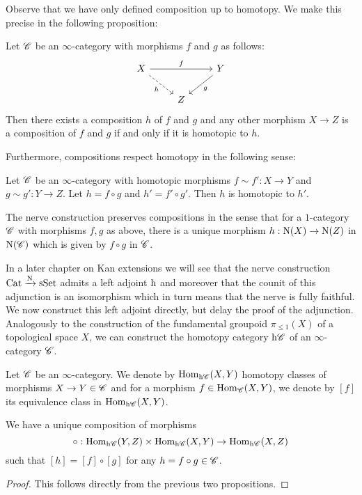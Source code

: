 \documentclass[../../thesis.tex]{subfiles}
\begin{document}
Observe that we have only defined composition up to homotopy.
We make this precise in the following proposition:
\begin{proposition}
    Let $\mathscr{C}$ be an $\infty$-category with morphisms $f$ and $g$ as follows:
    \[\begin{tikzcd}
            X && Y \\
            & Z
            \arrow["f", from=1-1, to=1-3]
            \arrow["g", from=1-3, to=2-2]
            \arrow["h"', dashed, from=1-1, to=2-2]
        \end{tikzcd}\]
    Then there exists a composition $h$ of $f$ and $g$ and any other morphism $X\to Z$ is a composition of $f$ and $g$ if and only if it is homotopic to $h$.
\end{proposition}
Furthermore, compositions respect homotopy in the following sense:
\begin{proposition}
    Let $\mathscr{C}$ be an $\infty$-category with homotopic morphisms $f \sim f':X \to Y$ and $g \sim g': Y \to Z$.
    Let $h=f\circ g$ and $h' = f' \circ g'$.
    Then $h$ is homotopic to $h'$.
\end{proposition}
\begin{remark}
    The nerve construction preserves compositions in the sense that for a $1$-category $\mathscr{C}$ with morphisms $f,g$ as above, there is a unique morphism $h:\mathrm{N}(X)\to \mathrm{N}(Z)$ in $\mathrm{N}(\mathscr{C})$ which is given by $f\circ g$ in $\mathscr{C}$.
\end{remark}
In a later chapter on Kan extensions we will see that the nerve construction $\mathrm{Cat} \xrightarrow{\mathrm{N}} \mathrm{sSet}$ admits a left adjoint $\mathrm{h}$ and moreover that the counit of this adjunction is an isomorphism which in turn means that the nerve is fully faithful.
We now construct this left adjoint directly, but delay the proof of the adjunction.
Analogously to the construction of the fundamental groupoid $\pi_{\leq 1}(X)$ of a topological space $X$, we can construct the homotopy category $\mathrm{h}\mathscr{C}$ of an $\infty$-category $\mathscr{C}$.
\begin{definition}
    Let $\mathscr{C}$ be an $\infty$-category.
    We denote by $\mathrm{Hom}_{\mathrm{h}\mathscr{C}}(X,Y)$ homotopy classes of morphisms $X\to Y \in \mathscr{C}$ and for a morphism $f \in \mathrm{Hom}_{\mathscr{C}}(X,Y)$, we denote by $[f]$ its equivalence class in $\mathrm{Hom}_{\mathrm{h}\mathscr{C}}(X,Y)$.
\end{definition}
\begin{proposition}
    We have a unique composition of morphisms
    \[
        \circ : \mathrm{Hom}_{\mathrm{h}\mathscr{C}}(Y, Z) \times \mathrm{Hom}_{\mathrm{h}\mathscr{C}}(X, Y) \rightarrow \mathrm{Hom}_{\mathrm{h}\mathscr{C}}(X, Z)
    \]
    such that $[h] = [f] \circ [g]$ for any $h = f\circ g \in \mathscr{C}$.
\end{proposition}
\begin{proof}
    This follows directly from the previous two propositions.
\end{proof}
\end{document}

